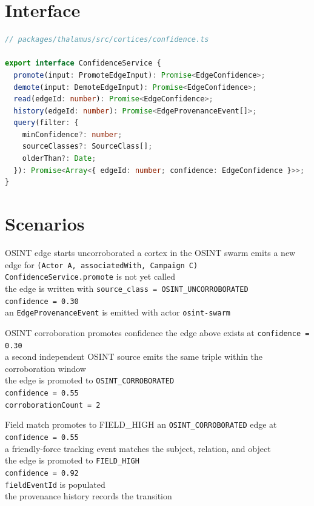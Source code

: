 \section{Interface}

\begin{lstlisting}[language=TypeScript]
// packages/thalamus/src/cortices/confidence.ts

export interface ConfidenceService {
  promote(input: PromoteEdgeInput): Promise<EdgeConfidence>;
  demote(input: DemoteEdgeInput): Promise<EdgeConfidence>;
  read(edgeId: number): Promise<EdgeConfidence>;
  history(edgeId: number): Promise<EdgeProvenanceEvent[]>;
  query(filter: {
    minConfidence?: number;
    sourceClasses?: SourceClass[];
    olderThan?: Date;
  }): Promise<Array<{ edgeId: number; confidence: EdgeConfidence }>>;
}
\end{lstlisting}

\section{Scenarios}

\begin{scenario}{OSINT edge starts uncorroborated}
\Given a cortex in the OSINT swarm emits a new edge for \texttt{(Actor A, associatedWith, Campaign C)} \\
\When \texttt{ConfidenceService.promote} is not yet called \\
\Then the edge is written with \texttt{source\_class = OSINT\_UNCORROBORATED} \\
\And \texttt{confidence = 0.30} \\
\And an \texttt{EdgeProvenanceEvent} is emitted with actor \texttt{osint-swarm}
\end{scenario}

\begin{scenario}{OSINT corroboration promotes confidence}
\Given the edge above exists at \texttt{confidence = 0.30} \\
\When a second independent OSINT source emits the same triple within the corroboration window \\
\Then the edge is promoted to \texttt{OSINT\_CORROBORATED} \\
\And \texttt{confidence = 0.55} \\
\And \texttt{corroborationCount = 2}
\end{scenario}

\begin{scenario}{Field match promotes to FIELD\_HIGH}
\Given an \texttt{OSINT\_CORROBORATED} edge at \texttt{confidence = 0.55} \\
\When a friendly-force tracking event matches the subject, relation, and object \\
\Then the edge is promoted to \texttt{FIELD\_HIGH} \\
\And \texttt{confidence = 0.92} \\
\And \texttt{fieldEventId} is populated \\
\And the provenance history records the transition
\end{scenario}

